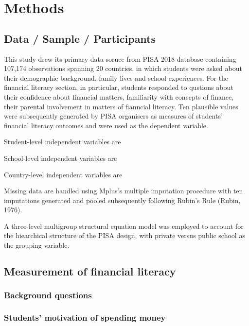 \documentclass[a4paper,11pt,UKenglish,twoside,openright]{report}\usepackage[]{graphicx}\usepackage[]{color}
\begin{document}

\chapter{Methods}
\label{chp:3}

\section{Data / Sample / Participants}

This study drew its primary data soruce from PISA 2018 database \parencite{FLdata} containing 107,174 observations spanning 20 countries, in which students were asked about their demographic background, family lives and school experiences. For the financial literacy section, in particular, students responded to qustions about their confidence about financial matters, familiarity with concepts of finance, their parental involvement in matters of fianncial literacy. Ten plausible values were subsequently generated by PISA organisers as measures of students' financial literacy outcomes and were used as the dependent variable.

Student-level independent variables are

School-level independent variables are

Country-level independent variables are

Missing data are handled using Mplus's multiple imputation procedure with ten imputations generated and pooled subsequently following Rubin's Rule (Rubin, 1976).

A three-level multigroup structural equation model was employed to account for the hiearchical structure of the PISA design, with private versus public school as the grouping variable.

\section{Measurement of financial literacy}

\subsection{Background questions}

\subsection{Students' motivation of spending money}
\end{document}
